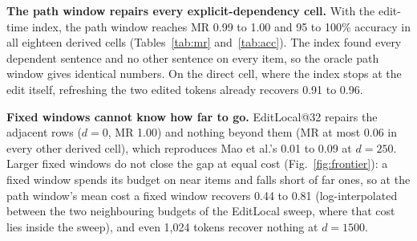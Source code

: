 \documentclass[conference]{IEEEtran}
\begin{document}
\textbf{The path window repairs every explicit-dependency cell.} With the edit-time index, the path window reaches MR 0.99 to 1.00
and 95 to 100\% accuracy in all eighteen derived cells (Tables~\ref{tab:mr} and~\ref{tab:acc}). The index
found every dependent sentence and no other sentence on every item, so the oracle path window gives identical
numbers. On the direct cell, where the index stops at the edit itself, refreshing the two edited tokens already
recovers 0.91 to 0.96.

\textbf{Fixed windows cannot know how far to go.} EditLocal@32 repairs the adjacent rows ($d=0$, MR 1.00) and
nothing beyond them (MR at most 0.06 in every other derived cell), which reproduces Mao et al.'s 0.01 to 0.09
at $d=250$. Larger fixed windows do not close the gap at equal cost (Fig.~\ref{fig:frontier}): a fixed window
spends its budget on near items and falls short of far ones, so at the path window's mean cost a fixed window
recovers 0.44 to 0.81 (log-interpolated between the two neighbouring budgets of the EditLocal sweep, where that
cost lies inside the sweep), and even 1,024 tokens recover nothing at $d=1500$.
\end{document}
